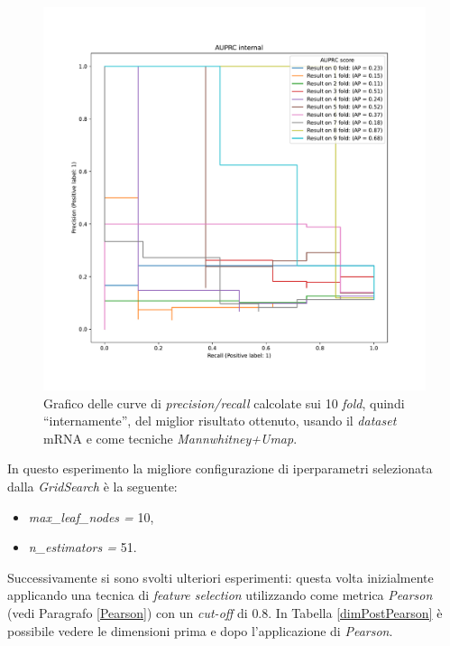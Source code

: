 \documentclass[12pt,italian]{report}
\begin{document}
	
	\begin{figure}[h!]
		\centering
		\includegraphics[width=1\linewidth]{immagini/mannwhitneyu_with_umap_AUPRC_Internal}
		\caption{Grafico delle curve di \textit{precision/recall} calcolate sui 10 \textit{fold}, quindi ``internamente'', del miglior risultato ottenuto, usando il \textit{dataset} mRNA e come tecniche \textit{Mannwhitney+Umap}.}
		\label{fig:mannwhitneyuwithumapauprcinternal}
	\end{figure}
	In questo esperimento la migliore configurazione di iperparametri selezionata dalla \textit{GridSearch} è la seguente:
	\begin{itemize}
		\item \textit{max\_leaf\_nodes = } 10,
		\item \textit{n\_estimators = } 51.
	\end{itemize}

	Successivamente si sono svolti ulteriori esperimenti: questa volta inizialmente applicando una tecnica di \textit{feature selection} utilizzando come metrica \textit{Pearson} (vedi Paragrafo \ref{Pearson}) con un \textit{cut-off} di $0.8$. 
	In Tabella \ref{dimPostPearson} è possibile vedere le dimensioni prima e dopo l'applicazione di \textit{Pearson}.
\end{document}
